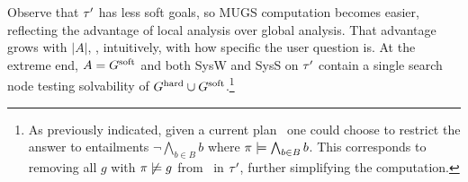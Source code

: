 Observe that $\tau'$ has less soft goals, so MUGS computation becomes
easier, reflecting the advantage of local analysis over global
analysis. That advantage grows with $|A|$, \ie, intuitively, with how
specific the user question is. At the extreme end, $A = G^{\text{\textup{soft}}}$ and
both SysW and SysS on $\tau'$ contain a single search node testing
solvability of $G^{\text{\textup{hard}}} \cup G^{\text{\textup{soft}}}$.\footnote{As previously
  indicated, given a current plan \plan\ one could choose to restrict
  the answer to entailments $\neg \bigwedge_{b \in B} b$ where $\pi
  \models \bigwedge_{b \in B} b$. This corresponds to removing all $g$
  with $\pi \not\models g$ from \goalsoft\ in $\tau'$, further
  simplifying the computation.}






















